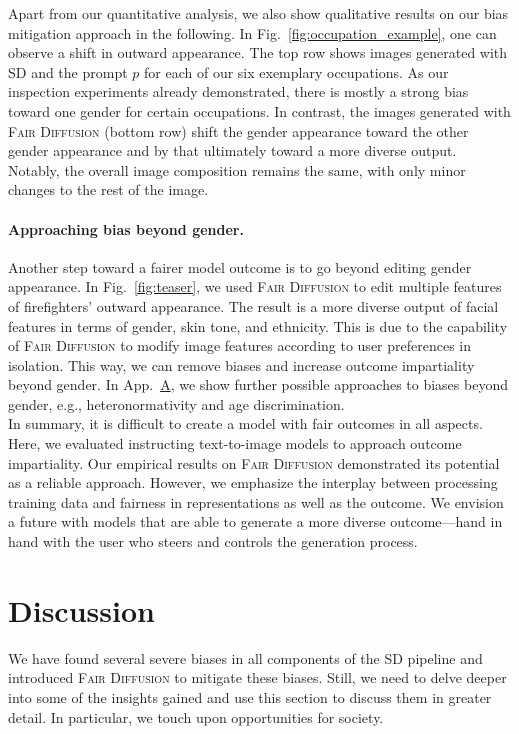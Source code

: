 \documentclass{article}%
\begin{document}
Apart from our quantitative analysis, we also show qualitative results on our bias mitigation approach in the following. In Fig.~\ref{fig:occupation_example}, one can observe a shift in outward appearance. The top row shows images generated with SD and the prompt $p$ for each of our six exemplary occupations. As our inspection experiments already demonstrated, there is mostly a strong bias toward one gender for certain occupations. 
In contrast, the images generated with \textsc{Fair Diffusion} (bottom row) shift the gender appearance toward the other gender appearance and by that ultimately toward a more diverse output. Notably, the overall image composition remains the same, with only minor changes to the rest of the image. 

\paragraph{Approaching bias beyond gender.}
Another step toward a fairer model outcome is to go beyond editing gender appearance. In Fig.~\ref{fig:teaser}, we used \textsc{Fair Diffusion} to edit multiple features of firefighters' outward appearance. The result is a more diverse output of facial features in terms of gender, skin tone, and ethnicity. This is due to the capability of \textsc{Fair Diffusion} to modify image features according to user preferences in isolation. This way, we can remove biases and increase outcome impartiality beyond gender. In App.~\hyperref[sec:add-fadi-imgs]{A}, we show further possible approaches to biases beyond gender, e.g., heteronormativity and age discrimination. \\

In summary, it is difficult to create a model with fair outcomes in all aspects. Here, we evaluated instructing text-to-image models to approach outcome impartiality. Our empirical results on \textsc{Fair Diffusion} demonstrated its potential as a reliable approach. However, we emphasize the interplay between processing training data and fairness in representations as well as the outcome. 
We envision a future with models that are able to generate a more diverse outcome---hand in hand with the user who steers and controls the generation process.

\section*{Discussion}\label{sec:discussion}
We have found several severe biases in all components of the SD pipeline and introduced \textsc{Fair Diffusion} to mitigate these biases. Still, we need to delve deeper into some of the insights gained and use this section to discuss them in greater detail. In particular, we touch upon opportunities for society.
\end{document}
